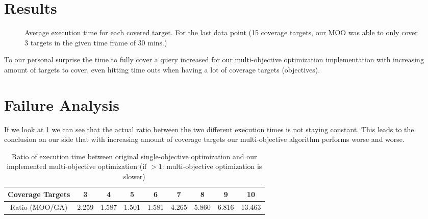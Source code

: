 \section{Results}
\label{sec:results}

\begin{figure}
	\centering
	\caption{Average execution time for each covered target. For the last data point (15 coverage targets, our MOO was able to only cover 3 targets in the given time frame of 30 mins.)}
	\label{fig:execution_time_results}
\end{figure}

To our personal surprise the time to fully cover a query increased for our multi-objective optimization implementation with increasing amount of targets to cover, even hitting time outs when having a lot of coverage targets (objectives).

\section{Failure Analysis}

If we look at \cref{tbl:ratio_coverage_targets} we can see that the actual ratio between the two different execution times is not staying constant. This leads to the conclusion on our side that with increasing amount of coverage targets our multi-objective algorithm performs worse and worse.

\begin{table}
	\centering
	\caption{Ratio of execution time between original single-objective optimization and our implemented multi-objective optimization (if $>1$: multi-objective optimization is slower)}
	\begin{tabular}{c|c|c|c|c|c|c|c|c}
		Coverage Targets & 3 & 4 & 5 & 6 & 7 & 8 & 9 & 10 \\ 
		\hline
		Ratio (MOO/GA) & 2.259 & 1.587 & 1.501 & 1.581 & 4.265 & 5.860 & 6.816 & 13.463
	\end{tabular} 
	\label{tbl:ratio_coverage_targets}
\end{table}

